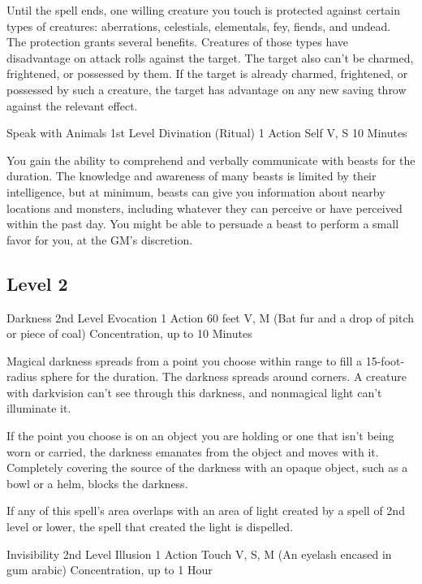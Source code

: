 \documentclass[letterpaper,openany,oneside,twocolumn]{book}
\begin{document}
Until the spell ends, one willing creature you touch is protected against certain types of creatures: aberrations, celestials, elementals, fey, fiends, and undead.\\
The protection grants several benefits. Creatures of those types have disadvantage on attack rolls against the target. The target also can't be charmed, frightened, or possessed by them. If the target is already charmed, frightened, or possessed by such a creature, the target has advantage on any new saving throw against the relevant effect.

\DndSpellHeader
  {Speak with Animals}
  {1st Level Divination (Ritual)}
  {1 Action}
  {Self}
  {V, S}
  {10 Minutes}
  
You gain the ability to comprehend and verbally communicate with beasts for the duration. The knowledge and awareness of many beasts is limited by their intelligence, but at minimum, beasts can give you information about nearby locations and monsters, including whatever they can perceive or have perceived within the past day. You might be able to persuade a beast to perform a small favor for you, at the GM's discretion.

\subsection*{Level 2}

\DndSpellHeader
  {Darkness}
  {2nd Level Evocation}
  {1 Action}
  {60 feet}
  {V, M (Bat fur and a drop of pitch or piece of coal)}
  {Concentration, up to 10 Minutes}
  
Magical darkness spreads from a point you choose within range to fill a 15-foot-radius sphere for the duration. The darkness spreads around corners. A creature with darkvision can't see through this darkness, and nonmagical light can't illuminate it.

If the point you choose is on an object you are holding or one that isn't being worn or carried, the darkness emanates from the object and moves with it. Completely covering the source of the darkness with an opaque object, such as a bowl or a helm, blocks the darkness.

If any of this spell's area overlaps with an area of light created by a spell of 2nd level or lower, the spell that created the light is dispelled.

\DndSpellHeader
  {Invisibility}
  {2nd Level Illusion}
  {1 Action}
  {Touch}
  {V, S, M (An eyelash encased in gum arabic)}
  {Concentration, up to 1 Hour}
  
\end{document}
